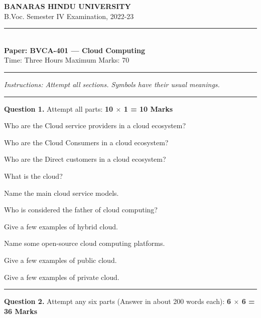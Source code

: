 \documentclass[11pt,a4paper]{article}
\begin{document}
\begin{center}
  {\large\bfseries BANARAS HINDU UNIVERSITY}\\[2pt]
  {
\normalsize B.Voc. Semester IV Examination, 2022-23}\\[6pt]
  \rule{0.8\linewidth}{0.5pt}\\[6pt]
  {\large\bfseries Paper: BVCA-401 --- Cloud Computing}\\[4pt]
  {
\normalsize Time: Three Hours \hfill Maximum Marks: 70}
\end{center}

\rule{\linewidth}{0.4pt}

\smallskip



\noindent   \textit{Instructions: Attempt all sections. Symbols have their usual meanings.}

\bigskip




\rule{\linewidth}{0.4pt}\smallskip




\noindent   \textbf{Question 1.} Attempt all parts: \hfill   \textbf{10 $ \times$ 1 = 10 Marks}

\begin{parts}
  \item Who are the Cloud service providers in a cloud ecosystem?
  \item Who are the Cloud Consumers in a cloud ecosystem?
  \item Who are the Direct customers in a cloud ecosystem?
  \item What is the cloud?
  \item Name the main cloud service models.
  \item Who is considered the father of cloud computing?
  \item Give a few examples of hybrid cloud.
  \item Name some open-source cloud computing platforms.
  \item Give a few examples of public cloud.
  \item Give a few examples of private cloud.
\end{parts}

\bigskip


\rule{\linewidth}{0.4pt}\smallskip




\noindent   \textbf{Question 2.} Attempt any six parts (Answer in about 200 words each): \hfill   \textbf{6 $ \times$ 6 = 36 Marks}
\end{document}
